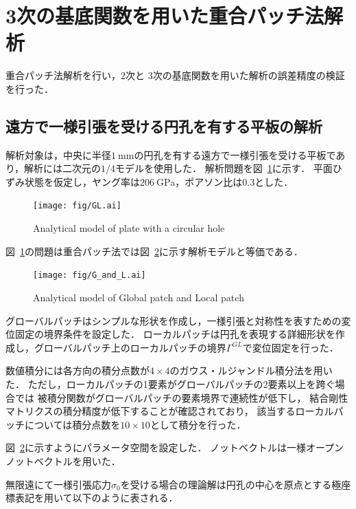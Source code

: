 \newpage

\section{3次の基底関数を用いた重合パッチ法解析}
重合パッチ法解析を行い，2次と
3次の基底関数を用いた解析の誤差精度の検証を行った．

\subsection{遠方で一様引張を受ける円孔を有する平板の解析}

解析対象は，中央に半径$1\ $mmの円孔を有する遠方で一様引張を受ける平板であり，解析には二次元の$1/4$モデルを使用した．
解析問題を図~\ref{fig:GL}に示す．
平面ひずみ状態を仮定し，ヤング率は$206\ $GPa，ポアソン比は$0.3$とした．

\begin{figure}[htbp]
  \centering
  \texttt{[image: fig/GL.ai]}
  \caption{Analytical model of plate with a circular hole}
  \label{fig:GL}
\end{figure}

\noindent
図~\ref{fig:GL}の問題は重合パッチ法では図~\ref{fig:G_and_L}に示す解析モデルと等価である．

\begin{figure}[htbp]
  \centering
  \texttt{[image: fig/G\_and\_L.ai]}
  \caption{Analytical model of Global patch and Local patch}
  \label{fig:G_and_L}
\end{figure}

\newpage

\noindent
グローバルパッチはシンプルな形状を作成し，一様引張と対称性を表すための変位固定の境界条件を設定した．
ローカルパッチは円孔を表現する詳細形状を作成し，グローバルパッチ上のローカルパッチの境界$\Gamma^{GL}$で変位固定を行った．

数値積分には各方向の積分点数が$4\times 4$のガウス・ルジャンドル積分法を用いた．
ただし，ローカルパッチの1要素がグローバルパッチの2要素以上を跨ぐ場合では
被積分関数がグローバルパッチの要素境界で連続性が低下し，
結合剛性マトリクスの積分精度が低下することが確認されており，
該当するローカルパッチについては積分点数を$10\times 10$として積分を行った．

図~\ref{fig:G_and_L}に示すようにパラメータ空間を設定した．
ノットベクトルは一様オープンノットベクトルを用いた．

無限遠にて一様引張応力$\sigma_0$を受ける場合の理論解は円孔の中心を原点とする極座標表記を用いて以下のように表される．

